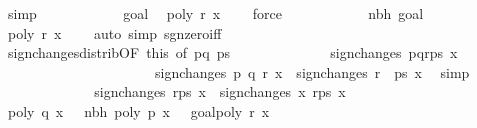 \begin{isabellebody}
\ simp\isanewline
\ \ \ \ \ \ \ \ \ \ \isamarkupfalse%
\ goal{}\ \isamarkupfalse%
\ {\isachardoublequoteopen}poly\ r\ x\ {\isasymnoteq}\ {}{\isachardoublequoteclose}\ \isamarkupfalse%
\ force\isanewline
\ \ \ \ \ \ \ \ \ \ \isamarkupfalse%
\ nbh\ goal{}{\isacharparenleft}{}{\isacharparenright}\ \isamarkupfalse%
\ {\isachardoublequoteopen}poly\ r\ x\ {\isasymnoteq}\ {}{\isachardoublequoteclose}\ \isamarkupfalse%
\ {\isacharparenleft}auto\ simp{\isacharcolon}\ sgn{\isacharunderscore}zero{\isacharunderscore}iff{\isacharparenright}\isanewline
\ \ \ \ \ \ \ \ \ \ \isamarkupfalse%
\ sign{\isacharunderscore}changes{\isacharunderscore}distrib{\isacharbrackleft}OF\ this{\isacharcomma}\ of\ {\isachardoublequoteopen}{\isacharbrackleft}p{\isacharcomma}q{\isacharbrackright}{\isachardoublequoteclose}\ ps{\isacharbrackright}\isanewline
\ \ \ \ \ \ \ \ \ \ \ \ \isamarkupfalse%
\ {\isachardoublequoteopen}sign{\isacharunderscore}changes\ {\isacharparenleft}p{\isacharhash}q{\isacharhash}r{\isacharhash}ps{\isacharparenright}\ x\ {\isacharequal}\isanewline
\ \ \ \ \ \ \ \ \ \ \ \ \ \ \ \ \ \ \ \ \ \ sign{\isacharunderscore}changes\ {\isacharparenleft}{\isacharbrackleft}p{\isacharcomma}\ q{\isacharcomma}\ r{\isacharbrackright}{\isacharparenright}\ x\ {\isacharplus}\ sign{\isacharunderscore}changes\ {\isacharparenleft}r\ {\isacharhash}\ ps{\isacharparenright}\ x{\isachardoublequoteclose}\ \isamarkupfalse%
\ simp\isanewline
\ \ \ \ \ \ \ \ \ \ \isamarkupfalse%
\ \isamarkupfalse%
\ {\isachardoublequoteopen}sign{\isacharunderscore}changes\ {\isacharparenleft}r{\isacharhash}ps{\isacharparenright}\ x\ {\isacharequal}\ sign{\isacharunderscore}changes{\isacharprime}\ x\ {\isacharparenleft}r{\isacharhash}ps{\isacharparenright}\ x{\isachardoublequoteclose}\isanewline
\ \ \ \ \ \ \ \ \ \ \ \ \ \ \isamarkupfalse%
\ {\isacharbackquoteopen}poly\ q\ x\ {\isacharequal}\ {}{\isacharbackquoteclose}\ nbh\ {\isacharbackquoteopen}poly\ p\ x\ {\isasymnoteq}\ {}{\isacharbackquoteclose}\ goal{}{\isacharparenleft}{}{\isacharparenright}{\isacharbackquoteopen}poly\ r\ x\ {\isasymnoteq}\ {}{\isacharbackquoteclose}\isanewline
\ \ \ \ \ \ \ \ \ \ \ \ \ \ \isamarkupfalse%

\end{isabellebody}
